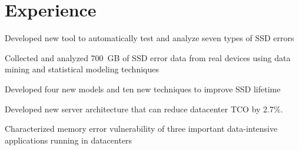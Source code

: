 \documentclass[]{resume}
\begin{document}
\hfill
\begin{minipage}[t]{0.64\textwidth}


\section{Experience}
\vspace{\topsep}
\begin{tightemize}
\item Developed new tool to automatically test and analyze seven types of SSD errors
\item Collected and analyzed 700~GB of SSD error data from real devices using data mining and statistical modeling techniques
\item Developed four new models and ten new techniques to improve SSD lifetime
\end{tightemize}
\sectionsep%

\begin{tightemize}
\item Developed new server architecture that can reduce datacenter TCO by 2.7\%.
\item Characterized memory error vulnerability of three important data-intensive applications running in datacenters
\end{tightemize}




\end{minipage}
\end{document}
